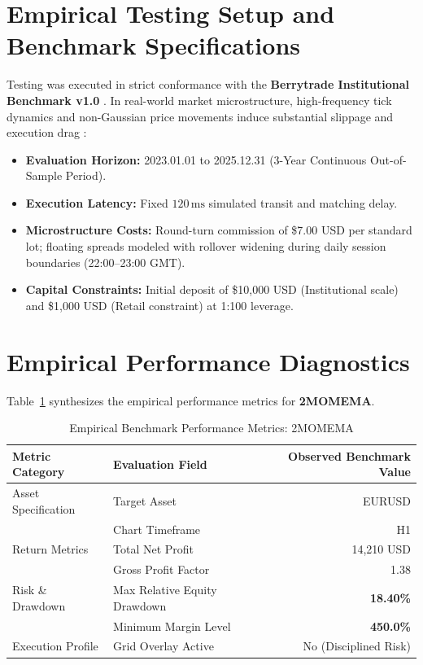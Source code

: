 \documentclass[11pt,a4paper]{article}
\begin{document}
\section{Empirical Testing Setup and Benchmark Specifications}
Testing was executed in strict conformance with the \textbf{Berrytrade Institutional Benchmark v1.0} \cite{artsu2026illusion}. In real-world market microstructure, high-frequency tick dynamics and non-Gaussian price movements induce substantial slippage and execution drag \cite{kyle1985continuous, amihud2002illiquidity, cont2001empirical, mandelbrot1963variation}:
\begin{itemize}
    \item \textbf{Evaluation Horizon:} 2023.01.01 to 2025.12.31 (3-Year Continuous Out-of-Sample Period).
    \item \textbf{Execution Latency:} Fixed $120\,\text{ms}$ simulated transit and matching delay.
    \item \textbf{Microstructure Costs:} Round-turn commission of \$7.00 USD per standard lot; floating spreads modeled with rollover widening during daily session boundaries (22:00--23:00 GMT).
    \item \textbf{Capital Constraints:} Initial deposit of \$10,000 USD (Institutional scale) and \$1,000 USD (Retail constraint) at 1:100 leverage.
\end{itemize}

\section{Empirical Performance Diagnostics}
Table~\ref{tab:metrics} synthesizes the empirical performance metrics for \textbf{2MOMEMA}.

\begin{table}[H]
\centering
\caption{Empirical Benchmark Performance Metrics: 2MOMEMA}
\label{tab:metrics}
\begin{tabular}{llr}
\toprule
\textbf{Metric Category} & \textbf{Evaluation Field} & \textbf{Observed Benchmark Value} \\
\midrule
Asset Specification & Target Asset & EURUSD \\
& Chart Timeframe & H1 \\
Return Metrics & Total Net Profit & 14,210 USD \\
& Gross Profit Factor & 1.38 \\
Risk \& Drawdown & Max Relative Equity Drawdown & \textbf{18.40\%} \\
& Minimum Margin Level & \textbf{450.0\%} \\
Execution Profile & Grid Overlay Active & No (Disciplined Risk) \\
\bottomrule
\end{tabular}
\end{table}
\end{document}
